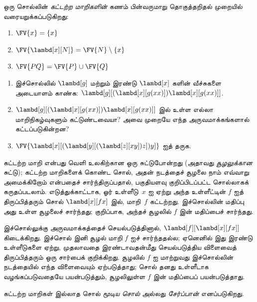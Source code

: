 \documentclass[../../../include/open-logic-section]{subfiles}
\begin{document}
\begin{defn}[ஒரு சொல்லின் கட்டற்ற மாறிகள்] 
  ஒரு சொல்லின் \emph{கட்டற்ற மாறிகளின்} கணம் பின்வருமாறு தொகுத்தறிதல் முறையில்
  வரையறுக்கப்படுகிறது:
  \begin{enumerate}
    \item $\FV{x} = \{x\}$ 
    \item $\FV{\lambd[x][N]} = \FV{N} \setminus \{x\}$    
    \item $\FV{PQ} = \FV{P} \cup \FV{Q}$ 
  \end{enumerate}
\end{defn}

\begin{prob}
  \begin{enumerate}
  \item இச்சொல்லில் $\lambd[g]$ மற்றும் இரண்டு $\lambd[x]$ களின் வீச்சுகளை
    அடையாளம் காண்க: $\lambd[g][(\lambd[x][g (x x)]) \lambd[x][g (x x)]]$.
  \item $\lambd[g][(\lambd[x][g (x x)]) \lambd[x][g (x x)]]$ இல் உள்ள
    எல்லா மாறிநிகழ்வுகளும் கட்டுண்டவையா? அவை முறையே எந்த அருவமாக்கங்களால்
    கட்டப்படுகின்றன?
    \item $\FV{\lambd[x][(\lambd[y][(\lambd[z][x y]) z]) y]}$ ஐத் தருக.
  \end{enumerate}
\end{prob}

\begin{explain}
கட்டற்ற மாறி என்பது வெளி உலகிற்கான ஒரு சுட்டுபோன்றது (அதாவது
\emph{சூழலுக்கான} சுட்டு); கட்டற்ற மாறிகளைக் கொண்ட சொல், அதன் நடத்தைச் சூழலை
நாம் எவ்வாறு அமைக்கிறோம் என்பதைச் சார்ந்திருப்பதால், பகுதியளவு குறிப்பிடப்பட்ட
சொல்லாகக் கருதப்படலாம். எடுத்துக்காட்டாக, ஓர் உள்ளீடு~$x$ ஐ ஏற்று அந்த
உள்ளீட்டின் $f$ ஐத் திருப்பித்தரும் சொல் $\lambd[x][f x]$ இல், மாறி~$f$
கட்டற்றது. இச்சொல்லின் மதிப்பு அது உள்ள சூழலைச் சார்ந்தது; குறிப்பாக, அந்தச்
சூழலில் $f$ இன் மதிப்பைச் சார்ந்தது.

இச்சொல்லுக்கு அருவமாக்கத்தைச் செயல்படுத்தினால்,
$\lambd[f][\lambd[x][f x]]$ கிடைக்கிறது. இச்சொல் இனி சூழல் மாறி $f$ ஐச்
சார்ந்ததல்ல; ஏனெனில் இது இரண்டு உள்ளீடுகளை ஏற்று, முதலாவதை இரண்டாவதன்மீது
செயல்படுத்திய விளைவைத் திருப்பித்தரும் ஒரு சார்பைக் குறிக்கிறது. சூழலில் $f$
ஐ மாற்றுவது இச்சொல்லின் நடத்தையில் எந்த விளைவையும் ஏற்படுத்தாது; சொல் தனது
உள்ளீடாக வழங்கப்படுவதையே பயன்படுத்தும், சூழலிலுள்ள $f$ இன் மதிப்பைப்
பயன்படுத்தாது.
\end{explain}

\begin{defn}[மூடிய சொல், சேர்ப்பான்]
  கட்டற்ற மாறிகள் இல்லாத சொல் \emph{மூடிய சொல்} அல்லது \emph{சேர்ப்பான்}
  எனப்படுகிறது.
\end{defn}
\end{document}
